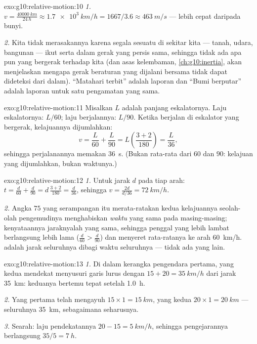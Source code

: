 \begin{solution}{exo:g10:relative-motion:10}
\emph{1.} $v = \frac{\qty{40000}{km}}{\qty{24}{h}}
\approx \qty{1.7e3}{km/h} = 1667/3.6 \approx \qty{463}{m/s}$ --- lebih
cepat daripada bunyi.

\emph{2.} Kita tidak merasakannya karena segala sesuatu di sekitar kita
--- tanah, udara, bangunan --- ikut serta dalam gerak yang persis sama,
sehingga tidak ada apa pun yang bergerak terhadap kita (dan asas
kelembaman, \cref{ch:g10:inertia}, akan menjelaskan mengapa gerak
beraturan yang dijalani bersama tidak dapat dideteksi dari dalam).
``Matahari terbit'' adalah laporan  dan ``Bumi berputar''
adalah laporan  untuk satu pengamatan yang sama.
\end{solution}

\begin{solution}{exo:g10:relative-motion:11}
Misalkan $L$ adalah panjang eskalatornya. Laju eskalatornya: $L/60$;
laju berjalannya: $L/90$. Ketika berjalan di eskalator yang bergerak,
kelajuannya dijumlahkan:
\[
v = \frac{L}{60} + \frac{L}{90} = L\left(\frac{3 + 2}{180}\right)
= \frac{L}{36},
\]
sehingga perjalanannya memakan \qty{36}{s}. (Bukan rata-rata dari $60$
dan $90$: kelajuan yang dijumlahkan, bukan waktunya.)
\end{solution}

\begin{solution}{exo:g10:relative-motion:12}
\emph{1.} Untuk jarak $d$ pada tiap arah:
$t = \frac{d}{60} + \frac{d}{90} = d\,\frac{3 + 2}{180} = \frac{d}{36}$,
sehingga $v = \frac{2d}{d/36} = \qty{72}{km/h}$.

\emph{2.} Angka $75$ yang serampangan itu merata-ratakan kedua
kelajuannya seolah-olah pengemudinya menghabiskan \emph{waktu} yang
sama pada masing-masing; kenyataannya jaraknyalah yang sama, sehingga
penggal yang lebih lambat berlangsung lebih lama
($\frac{d}{60} > \frac{d}{90}$) dan menyeret rata-ratanya ke arah
\qty{60}{km/h}.  adalah jarak seluruhnya dibagi waktu
seluruhnya --- tidak ada yang lain.
\end{solution}

\begin{solution}{exo:g10:relative-motion:13}
\emph{1.} Di dalam kerangka pengendara pertama, yang kedua mendekat
menyusuri garis lurus dengan $15 + 20 = \qty{35}{km/h}$ dari jarak
\qty{35}{km}: keduanya bertemu tepat setelah \qty{1.0}{h}.

\emph{2.} Yang pertama telah mengayuh $15 \times 1 = \qty{15}{km}$,
yang kedua $20 \times 1 = \qty{20}{km}$ --- seluruhnya \qty{35}{km},
sebagaimana seharusnya.

\emph{3.} Searah: laju pendekatannya $20 - 15 = \qty{5}{km/h}$,
sehingga pengejarannya berlangsung $35/5 = \qty{7}{h}$.
\end{solution}

